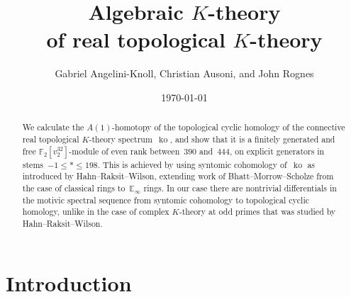 \documentclass{amsart}
\title[Algebraic $K$-theory of real topological $K$-theory] 
	{Algebraic $K$-theory \\ of real topological $K$-theory}
\author[G. Angelini-Knoll, Ch. Ausoni, and J. Rognes]
	{Gabriel Angelini-Knoll, Christian Ausoni, and John Rognes}
\date{\today}
\theoremstyle{definition}
\theoremstyle{remark}
\numberwithin{equation}{section}
\numberwithin{figure}{section}
\numberwithin{table}{section}
\DeclareMathOperator{\ko}{ko}
\newcommand{\bF}{\mathbb{F}}
\newcommand{\bE}{\mathbb{E}}
\newcommand{\<}{\langle}
\renewcommand{\:}{\colon}
\renewcommand{\>}{\rangle}
\begin{document}
 
\begin{abstract}
We calculate the $A(1)$-homotopy of the topological cyclic homology of
the connective real topological $K$-theory spectrum~$\ko$, and show that
it is a finitely generated and free $\bF_2[v_2^{32}]$-module of even rank
between~$390$ and~$444$, on explicit generators in stems~$-1 \le *\le 198$.
This is achieved by using syntomic cohomology of~$\ko$ as introduced by
Hahn--Raksit--Wilson, extending work of Bhatt--Morrow--Scholze from the
case of classical rings to~$\bE_{\infty}$ rings.  In our case there are
nontrivial differentials in the motivic spectral sequence from syntomic
cohomology to topological cyclic homology, unlike in the case of complex $K$-theory at odd primes that was studied by Hahn--Raksit--Wilson.
\end{abstract}
 

\maketitle 
 
\tableofcontents
\section{Introduction}\label{sec:intro} 
 






\begin{bibdiv}
\begin{biblist}
\end{biblist}
\end{bibdiv}
\end{document}
